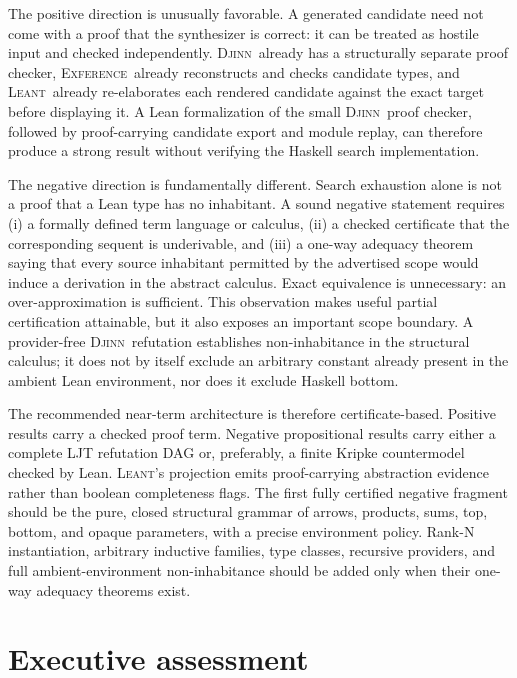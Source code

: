 \documentclass[11pt,letterpaper,openany]{report}
\theoremstyle{definition}
\theoremstyle{remark}
\newcommand{\Djinn}{\textsc{Djinn}}
\newcommand{\Exference}{\textsc{Exference}}
\newcommand{\Leant}{\textsc{Leant}}
\begin{document}
The positive direction is unusually favorable. A generated candidate need not come with a proof that the synthesizer is correct: it can be treated as hostile input and checked independently. \Djinn\ already has a structurally separate proof checker, \Exference\ already reconstructs and checks candidate types, and \Leant\ already re-elaborates each rendered candidate against the exact target before displaying it. A Lean formalization of the small \Djinn\ proof checker, followed by proof-carrying candidate export and module replay, can therefore produce a strong result without verifying the Haskell search implementation.

The negative direction is fundamentally different. Search exhaustion alone is not a proof that a Lean type has no inhabitant. A sound negative statement requires (i) a formally defined term language or calculus, (ii) a checked certificate that the corresponding sequent is underivable, and (iii) a one-way adequacy theorem saying that every source inhabitant permitted by the advertised scope would induce a derivation in the abstract calculus. Exact equivalence is unnecessary: an over-approximation is sufficient. This observation makes useful partial certification attainable, but it also exposes an important scope boundary. A provider-free \Djinn\ refutation establishes non-inhabitance in the structural calculus; it does not by itself exclude an arbitrary constant already present in the ambient Lean environment, nor does it exclude Haskell bottom.

The recommended near-term architecture is therefore certificate-based. Positive results carry a checked proof term. Negative propositional results carry either a complete LJT refutation DAG or, preferably, a finite Kripke countermodel checked by Lean. \Leant's projection emits proof-carrying abstraction evidence rather than boolean completeness flags. The first fully certified negative fragment should be the pure, closed structural grammar of arrows, products, sums, top, bottom, and opaque parameters, with a precise environment policy. Rank-N instantiation, arbitrary inductive families, type classes, recursive providers, and full ambient-environment non-inhabitance should be added only when their one-way adequacy theorems exist.

\tableofcontents
\clearpage
{}

\chapter{Executive assessment}
\label{ch:executive}
\end{document}
